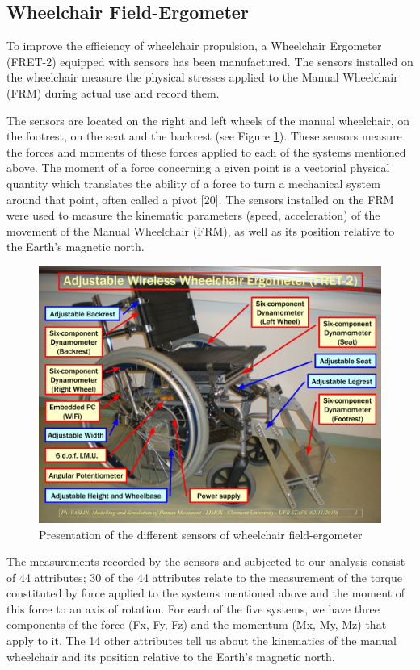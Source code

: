 \subsection{Wheelchair Field-Ergometer}
To improve the efficiency of wheelchair propulsion, a Wheelchair Ergometer (FRET-2) equipped with sensors has been manufactured. The sensors installed on the wheelchair measure the physical stresses applied to the Manual Wheelchair (FRM) during actual use and record them.


The sensors are located on the right and left wheels of the manual wheelchair, on the footrest, on the seat and the backrest (see Figure \ref{fret_legend}). These sensors measure the forces and moments of these forces applied to each of the systems mentioned above.  The moment of a force concerning a given point is a vectorial physical quantity which translates the ability of a force to turn a mechanical system around that point, often called a pivot [20]. The sensors installed on the FRM were used to measure the kinematic parameters (speed, acceleration) of the movement of the Manual Wheelchair (FRM), as well as its position relative to the Earth's magnetic north.


\begin{figure}[h]
\center
\includegraphics[scale = 0.4]{images/FRET-2_Legend_GB}
\caption{Presentation of the different sensors of wheelchair field-ergometer}
\label{fret_legend}
\end{figure}


The measurements recorded by the sensors and subjected to our analysis consist of 44 attributes; 30 of the 44 attributes relate to the measurement of the torque constituted by force applied to the systems mentioned above and the moment of this force to an axis of rotation. For each of the five systems, we have three components of the force (Fx, Fy, Fz) and the momentum (Mx, My, Mz) that apply to it. The 14 other attributes tell us about the kinematics of the manual wheelchair and its position relative to the Earth's magnetic north.

